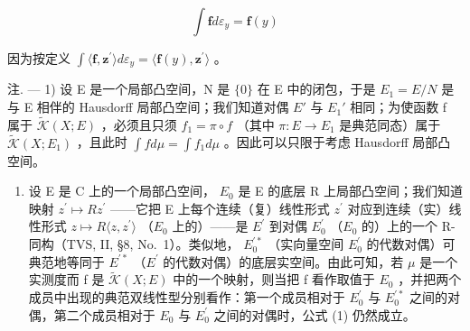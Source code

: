 \[
\int \mathbf {f} d \varepsilon_ {y} = \mathbf {f} (y)
\]

因为按定义 \(\int \langle \mathbf{f},\mathbf{z}^{\prime}\rangle d\varepsilon_{y} = \langle \mathbf{f}(y),\mathbf{z}^{\prime}\rangle\) 。

注. --- 1) 设 E 是一个局部凸空间，N 是 \(\{0\}\) 在 E 中的闭包，于是 \(E_{1} = E/N\) 是与 E 相伴的 Hausdorff 局部凸空间；我们知道对偶 \(E'\) 与 \(E_{1}'\) 相同；为使函数 f 属于 \(\widetilde{\mathcal{K}}(X;E)\) ，必须且只须 \(f_{1} = \pi \circ f\) （其中 \(\pi : E \to E_{1}\) 是典范同态）属于 \(\widetilde{\mathcal{K}}(X;E_{1})\) ，且此时 \(\int f d\mu = \int f_{1} d\mu\) 。因此可以只限于考虑 Hausdorff 局部凸空间。

\begin{enumerate}
\def\labelenumi{\arabic{enumi})}
\setcounter{enumi}{1}
\tightlist
\item
  设 E 是 C 上的一个局部凸空间， \(E_{0}\) 是 E 的底层 R 上局部凸空间；我们知道映射 \(z^{\prime} \mapsto Rz^{\prime}\) ——它把 E 上每个连续（复）线性形式 \(z^{\prime}\) 对应到连续（实）线性形式 \(z \mapsto R\langle z, z^{\prime} \rangle\) （\(E_{0}\) 上的）——是 \(E^{\prime}\) 到对偶 \(E_{0}^{\prime}\) （\(E_{0}\) 的）上的一个 R-同构（TVS, II, §8, No.~1）。类似地， \(E_{0}^{\prime *}\) （实向量空间 \(E_{0}^{\prime}\) 的代数对偶）可典范地等同于 \(E^{\prime *}\) （\(E^{\prime}\) 的代数对偶）的底层实空间。由此可知，若 \(\mu\) 是一个实测度而 f 是 \(\widetilde{\mathcal{K}}(X;E)\) 中的一个映射，则当把 f 看作取值于 \(E_{0}\) ，并把两个成员中出现的典范双线性型分别看作：第一个成员相对于 \(E_{0}^{\prime}\) 与 \(E_{0}^{\prime *}\) 之间的对偶，第二个成员相对于 \(E_{0}\) 与 \(E_{0}^{\prime}\) 之间的对偶时，公式 (1) 仍然成立。
\end{enumerate}

